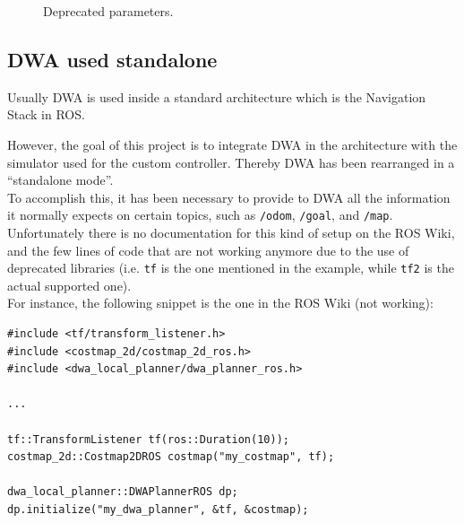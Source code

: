 \documentclass[11pt,a4paper]{article}
\begin{document}
\begin{figure}[H]
    \centering
    \quad
    \caption[]{Deprecated parameters.}
\end{figure}



\subsection{DWA used standalone}

Usually DWA is used inside a standard architecture which is the Navigation Stack in ROS.

However, the goal of this project is to integrate DWA in the architecture with the simulator used for
the custom controller. Thereby DWA has been rearranged in a ``standalone mode''.\\

To accomplish this, it has been necessary to provide to DWA all the information it normally expects on
certain topics, such as \texttt{/odom}, \texttt{/goal}, and \texttt{/map}.\\

Unfortunately there is no documentation for this kind of setup on the ROS Wiki, and the few lines of code
that are not working anymore due to the use of deprecated libraries (i.e. \texttt{tf} is the one mentioned
in the example, while \texttt{tf2} is the actual supported one).\\

For instance, the following snippet is the one in the ROS Wiki (not working):

\begin{lstlisting}
#include <tf/transform_listener.h>
#include <costmap_2d/costmap_2d_ros.h>
#include <dwa_local_planner/dwa_planner_ros.h>

...

tf::TransformListener tf(ros::Duration(10));
costmap_2d::Costmap2DROS costmap("my_costmap", tf);

dwa_local_planner::DWAPlannerROS dp;
dp.initialize("my_dwa_planner", &tf, &costmap);
\end{lstlisting}
\end{document}
